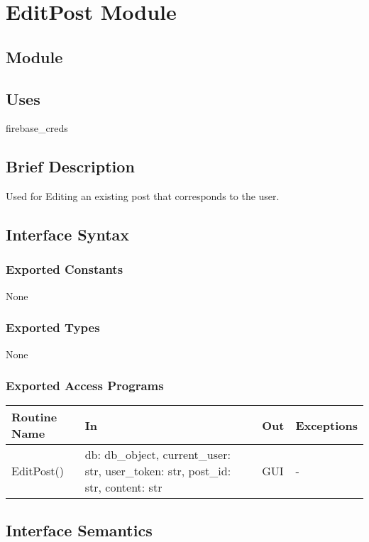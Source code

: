 \documentclass[12pt, titlepage]{article}
\begin{document}
\newpage
\section* {EditPost Module}

\subsection*{Module}

\subsection* {Uses}
firebase\_creds

\subsection* {Brief Description}
Used for Editing an existing post that corresponds to the user.

\subsection* {Interface Syntax}
\subsubsection* {Exported Constants}
None

\subsubsection* {Exported Types}
None

\subsubsection* {Exported Access Programs}
\begin{table}[!htb]
    \centering
    \begin{tabular}{|p{3cm}|p{3cm}|p{3cm}|p{4.5cm}|}
        \hline
        \textbf{Routine Name} & \textbf{In} & \textbf{Out} & \textbf{Exceptions} \\
        \hline
         EditPost() & db: db\_object, current\_user: str, user\_token: str, post\_id: str, content: str  & GUI & -\\
        \hline
    \end{tabular}
\end{table}

\subsection{Interface Semantics}
\end{document}
